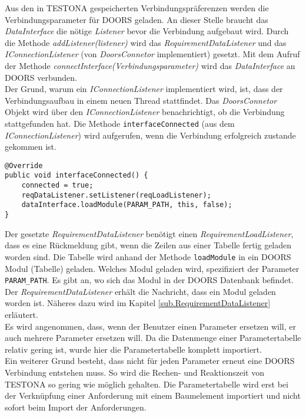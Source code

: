 Aus den in TESTONA gespeicherten Verbindungspräferenzen werden die Verbindungsparameter für DOORS geladen. An dieser Stelle braucht das \textit{DataInterface} die nötige \textit{Listener} bevor die Verbindung aufgebaut wird. Durch die Methode \textit{addListener(listener)} wird das \textit{RequirementDataListener} und das \textit{IConnectionListener} (von \textit{DoorsConnetor} implementiert) gesetzt. Mit dem Aufruf der Methode \textit{connectInterface(Verbindungsparameter)} wird das \textit{DataInterface} an DOORS verbunden.\\

Der Grund, warum ein \textit{IConnectionListener} implementiert wird, ist, dass der Verbindungsaufbau in einem neuen Thread stattfindet. Das \textit{DoorsConnetor} Objekt wird über den \textit{IConnectionListener} benachrichtigt, ob die Verbindung stattgefunden hat. Die Methode \texttt{interfaceConnected} (aus dem \textit{IConnectionListener}) wird aufgerufen, wenn die Verbindung erfolgreich zustande gekommen ist.

\begin{lstlisting}[caption={Verbindungsaufbau war erfolgreich}, captionpos=b]
@Override
public void interfaceConnected() {
	connected = true;
	reqDataListener.setListener(reqLoadListener);
	dataInterface.loadModule(PARAM_PATH, this, false);
}
\end{lstlisting}

Der gesetzte \textit{RequirementDataListener} benötigt einen \textit{RequirementLoadListener}, dass es eine Rückmeldung gibt, wenn die Zeilen aus einer Tabelle fertig geladen worden sind. Die Tabelle wird anhand der Methode \texttt{loadModule} in ein DOORS Modul (Tabelle) geladen. Welches Modul geladen wird, spezifiziert der Parameter \texttt{PARAM\_PATH}. Es gibt an, wo sich das Modul in der DOORS Datenbank befindet. Der \textit{RequirementDataListener} erhält die Nachricht, dass ein Modul geladen worden ist. Näheres dazu wird im Kapitel \ref{sub.RequirementDataListener} erläutert.\\


Es wird angenommen, dass, wenn der Benutzer einen Parameter ersetzen will, er auch mehrere Parameter ersetzen will. Da die Datenmenge einer Parametertabelle relativ gering ist, wurde hier die Parametertabelle komplett importiert. \\


Ein weiterer Grund besteht, dass nicht für jeden Parameter erneut eine DOORS Verbindung entstehen muss. So wird die Rechen- und Reaktionszeit von TESTONA so gering wie möglich gehalten. Die Parametertabelle wird erst bei der Verknüpfung einer Anforderung mit einem Baumelement importiert und nicht sofort beim Import der Anforderungen. \\


